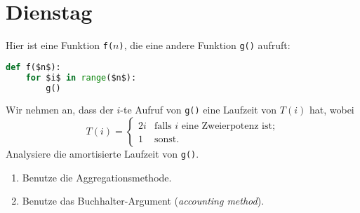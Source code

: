 \documentclass{uebung_cs}
\begin{document}
\section*{Dienstag}
\begin{exercise}
    Hier ist eine Funktion \texttt{f($n$)}, die eine andere Funktion \texttt{g()} aufruft:
    \begin{lstlisting}[frame=single,frameround=tttt,xleftmargin=2em,linewidth=0.5\textwidth,numbers=none,language=Python]
def f($n$):
    for $i$ in range($n$):
        g()
\end{lstlisting}
Wir nehmen an, dass der $i$-te Aufruf von \texttt{g()} eine Laufzeit von $T(i)$ hat, wobei
\[T(i) = \begin{cases} 2i & \text{falls $i$ eine Zweierpotenz ist;} \\ 1 & \text{sonst.} \end{cases}\]
Analysiere die amortisierte Laufzeit von \texttt{g()}.
    \begin{enumerate}
        \item Benutze die Aggregationsmethode.
        \item Benutze das Buchhalter-Argument (\textit{accounting method}).
    \end{enumerate}
\end{exercise}

        
\end{document}
